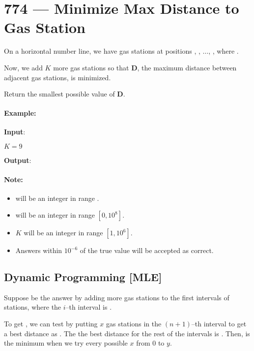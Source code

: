 \section{774 --- Minimize Max Distance to Gas Station}
On a horizontal number line, we have gas stations at positions , , $\ldots$, , where .

Now, we add $K$ more gas stations so that \textbf{D}, the maximum distance between adjacent gas stations, is minimized.

Return the smallest possible value of \textbf{D}.

\paragraph{Example:}

\begin{flushleft}
\textbf{Input}: 


$K = 9$

\textbf{Output}: 
\end{flushleft}

\paragraph{Note:}

\begin{itemize}
\item {} will be an integer in range \fcj{[10, 2000]}.
\item {} will be an integer in range $[0, 10^8]$.
\item $K$ will be an integer in range $[1, 10^6]$.
\item Answers within $10^{-6}$ of the true value will be accepted as correct.
\end{itemize}

\subsection{Dynamic Programming [MLE]}
Suppose  be the answer by adding  more gas stations to the first  intervals of stations, where the $i$--th interval is . 

To get , we can test by putting $x$ gas stations in the $(n+1)$--th interval to get a best distance as . The the best distance for the rest of the intervals is . Then,  is the minimum when we try every possible $x$ from 0 to $y$.

